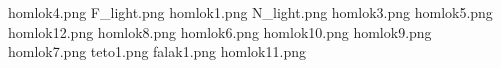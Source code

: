 homlok4.png
F_light.png
homlok1.png
N_light.png
homlok3.png
homlok5.png
homlok12.png
homlok8.png
homlok6.png
homlok10.png
homlok9.png
homlok7.png
teto1.png
falak1.png
homlok11.png
